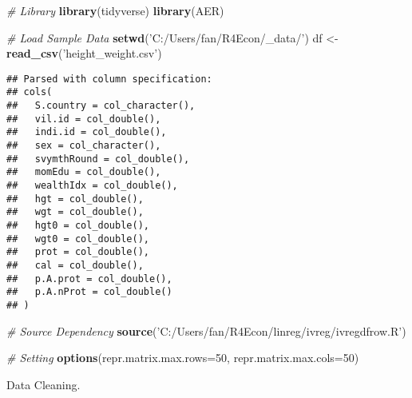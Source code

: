 \documentclass[
]{book}
\newenvironment{Shaded}{\begin{snugshade}}{\end{snugshade}}
\newcommand{\CommentTok}[1]{\textcolor[rgb]{0.56,0.35,0.01}{\textit{#1}}}
\newcommand{\DataTypeTok}[1]{\textcolor[rgb]{0.13,0.29,0.53}{#1}}
\newcommand{\DecValTok}[1]{\textcolor[rgb]{0.00,0.00,0.81}{#1}}
\newcommand{\KeywordTok}[1]{\textcolor[rgb]{0.13,0.29,0.53}{\textbf{#1}}}
\newcommand{\NormalTok}[1]{#1}
\newcommand{\OperatorTok}[1]{\textcolor[rgb]{0.81,0.36,0.00}{\textbf{#1}}}
\newcommand{\StringTok}[1]{\textcolor[rgb]{0.31,0.60,0.02}{#1}}
\begin{document}
\begin{Shaded}
\begin{Highlighting}[]
\CommentTok{# Library}
\KeywordTok{library}\NormalTok{(tidyverse)}
\KeywordTok{library}\NormalTok{(AER)}

\CommentTok{# Load Sample Data}
\KeywordTok{setwd}\NormalTok{(}\StringTok{'C:/Users/fan/R4Econ/_data/'}\NormalTok{)}
\NormalTok{df <-}\StringTok{ }\KeywordTok{read_csv}\NormalTok{(}\StringTok{'height_weight.csv'}\NormalTok{)}
\end{Highlighting}
\end{Shaded}

\begin{verbatim}
## Parsed with column specification:
## cols(
##   S.country = col_character(),
##   vil.id = col_double(),
##   indi.id = col_double(),
##   sex = col_character(),
##   svymthRound = col_double(),
##   momEdu = col_double(),
##   wealthIdx = col_double(),
##   hgt = col_double(),
##   wgt = col_double(),
##   hgt0 = col_double(),
##   wgt0 = col_double(),
##   prot = col_double(),
##   cal = col_double(),
##   p.A.prot = col_double(),
##   p.A.nProt = col_double()
## )
\end{verbatim}

\begin{Shaded}
\begin{Highlighting}[]
\CommentTok{# Source Dependency}
\KeywordTok{source}\NormalTok{(}\StringTok{'C:/Users/fan/R4Econ/linreg/ivreg/ivregdfrow.R'}\NormalTok{)}

\CommentTok{# Setting}
\KeywordTok{options}\NormalTok{(}\DataTypeTok{repr.matrix.max.rows=}\DecValTok{50}\NormalTok{, }\DataTypeTok{repr.matrix.max.cols=}\DecValTok{50}\NormalTok{)}
\end{Highlighting}
\end{Shaded}

Data Cleaning.

\begin{Shaded}
\end{Shaded}
\end{document}
